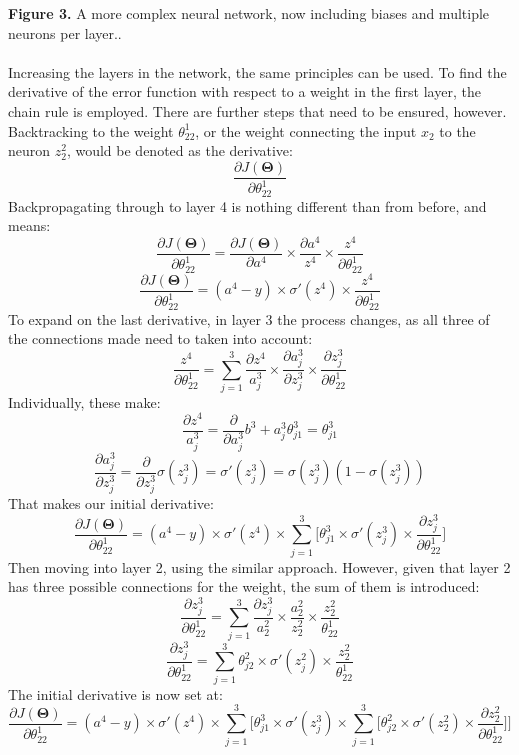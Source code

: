 \documentclass[a4paper,12pt]{article}
\begin{document}
\textbf{Figure 3.} A more complex neural network, now including biases and multiple neurons per layer.. \\ \\
Increasing the layers in the network, the same principles can be used. To find the derivative of the error function with respect to a weight in the first layer, the chain rule is employed. There are further steps that need to be ensured, however. Backtracking to the weight $\theta^1_{22}$, or the weight connecting the input $x_2$ to the neuron $z^2_2$, would be denoted as the derivative:
\[\frac{\partial J(\boldsymbol{\Theta})}{\partial \theta^1_{22}}\]
Backpropagating through to layer 4 is nothing different than from before, and means:
\[\frac{\partial J(\boldsymbol{\Theta})}{\partial \theta^1_{22}} = \frac{\partial J(\boldsymbol{\Theta})}{\partial a^4} \times \frac{\partial a^4}{z^4} \times \frac{z^4}{\partial \theta_{22}^1}\]
\[\frac{\partial J(\boldsymbol{\Theta})}{\partial \theta^1_{22}} = (a^4 - y) \times \sigma'(z^4) \times \frac{z^4}{\partial \theta_{22}^1}\]
To expand on the last derivative, in layer 3 the process changes, as all three of the connections made need to taken into account:
\[\frac{z^4}{\partial \theta_{22}^1} = \sum_{j=1}^3 \frac{\partial z^4}{a^3_j} \times \frac{\partial a^3_j}{\partial z^3_j} \times \frac{\partial z^3_j}{\partial \theta_{22}^1}\]
Individually, these make:
\[\frac{\partial z^4}{a^3_j} = \frac{\partial}{\partial a^3_j} b^3 + a^3_j\theta^3_{j1} = \theta^3_{j1}\]
\[\frac{\partial a^3_j}{\partial z^3_j} = \frac{\partial }{\partial z^3_j} \sigma(z^3_j) = \sigma'(z^3_j) = \sigma(z^3_j)(1-\sigma(z^3_j))\]
That makes our initial derivative:
\[\frac{\partial J(\boldsymbol{\Theta})}{\partial \theta^1_{22}} = (a^4 - y) \times \sigma'(z^4) \times \sum_{j=1}^3 \Big[\theta^3_{j1} \times \sigma'(z^3_j) \times \frac{\partial z^3_j}{\partial \theta^1_{22}}\Big]\]
Then moving into layer 2, using the similar approach. However, given that layer 2 has three possible connections for the weight, the sum of them is introduced:
\[\frac{\partial z^3_j}{\partial \theta^1_{22}} = \sum_{j=1}^{3} \frac{\partial z^3_j}{a^2_2} \times \frac{a^2_2}{z^2_2} \times \frac{z^2_2}{\theta_{22}^1}\]
\[\frac{\partial z^3_j}{\partial \theta^1_{22}} = \sum_{j=1}^{3} \theta^2_{j2} \times \sigma'(z^2_j) \times \frac{z^2_2}{\theta_{22}^1}\]
The initial derivative is now set at:
\[\frac{\partial J(\boldsymbol{\Theta})}{\partial \theta^1_{22}} = (a^4 - y) \times \sigma'(z^4) \times \sum_{j=1}^3 \Big[\theta^3_{j1} \times \sigma'(z^3_j) \times \sum_{j=1}^{3} \Big[ \theta^2_{j2} \times \sigma'(z^2_2) \times \frac{\partial z^2_2}{\partial \theta_{22}^1}\Big]\Big]\]
\end{document}
